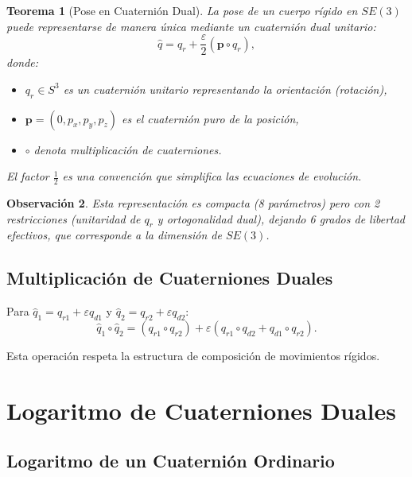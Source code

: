 \documentclass[11pt,a4paper]{article}
\newtheorem{theorem}{Teorema}[section]
\newtheorem{remark}[theorem]{Observación}
\begin{document}
\begin{theorem}[Pose en Cuaternión Dual]
La pose de un cuerpo rígido en $SE(3)$ puede representarse de manera única mediante un cuaternión dual unitario:
\begin{equation}
    \hat{q} = q_r + \frac{\varepsilon}{2} (\mathbf{p} \circ q_r),
\end{equation}
donde:
\begin{itemize}
    \item $q_r \in S^3$ es un cuaternión unitario representando la orientación (rotación),
    \item $\mathbf{p} = (0, p_x, p_y, p_z)$ es el cuaternión puro de la posición,
    \item $\circ$ denota multiplicación de cuaterniones.
\end{itemize}

El factor $\frac{1}{2}$ es una convención que simplifica las ecuaciones de evolución.
\end{theorem}

\begin{remark}
Esta representación es \emph{compacta} (8 parámetros) pero con 2 restricciones (unitaridad de $q_r$ y ortogonalidad dual), dejando 6 grados de libertad efectivos, que corresponde a la dimensión de $SE(3)$.
\end{remark}

\subsection{Multiplicación de Cuaterniones Duales}

Para $\hat{q}_1 = q_{r1} + \varepsilon q_{d1}$ y $\hat{q}_2 = q_{r2} + \varepsilon q_{d2}$:
\begin{equation}
    \hat{q}_1 \circ \hat{q}_2 = (q_{r1} \circ q_{r2}) + \varepsilon (q_{r1} \circ q_{d2} + q_{d1} \circ q_{r2}).
\end{equation}

Esta operación respeta la estructura de composición de movimientos rígidos.

\section{Logaritmo de Cuaterniones Duales}
\label{sec:dual_log}

\subsection{Logaritmo de un Cuaternión Ordinario}
\end{document}
